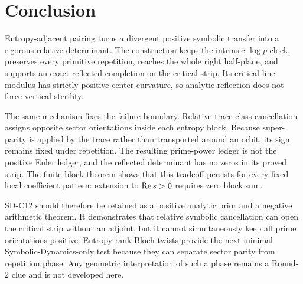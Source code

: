 \section{Conclusion}
\label{sec:conclusion}

Entropy-adjacent pairing turns a divergent positive symbolic transfer into a
rigorous relative determinant.  The construction keeps the intrinsic
$\log p$ clock, preserves every primitive repetition, reaches the whole right
half-plane, and supports an exact reflected completion on the critical strip.
Its critical-line modulus has strictly positive center curvature, so analytic
reflection does not force vertical sterility.

The same mechanism fixes the failure boundary.  Relative trace-class
cancellation assigns opposite sector orientations inside each entropy block.
Because super-parity is applied by the trace rather than transported around an
orbit, its sign remains fixed under repetition.  The resulting prime-power
ledger is not the positive Euler ledger, and the reflected determinant has no
zeros in its proved strip.  The finite-block theorem shows that this tradeoff
persists for every fixed local coefficient pattern: extension to
$\operatorname{Re} s>0$ requires zero block sum.

SD-C12 should therefore be retained as a positive analytic prior and a negative
arithmetic theorem.  It demonstrates that relative symbolic cancellation can
open the critical strip without an adjoint, but it cannot simultaneously keep
all prime orientations positive.  Entropy-rank Bloch twists provide the next
minimal Symbolic-Dynamics-only test because they can separate sector parity
from repetition phase.  Any geometric interpretation of such a phase remains
a Round-2 clue and is not developed here.
